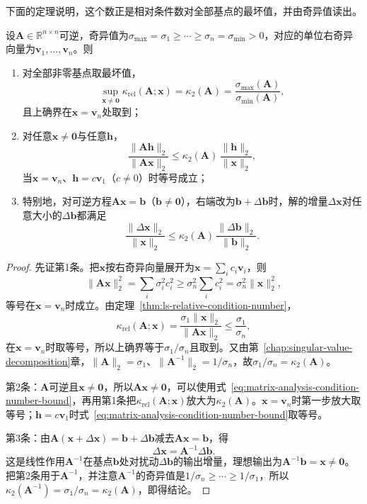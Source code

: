 下面的定理说明，这个数正是相对条件数对全部基点的最坏值，并由奇异值读出。
\begin{theorem}[条件数是相对条件数的最坏值]
\label{thm:matrix-analysis-condition-number-bound}
设$\bm A\in\mathbb R^{n\times n}$可逆，奇异值为$\sigma_{\max}=\sigma_1\geq\cdots\geq\sigma_n=\sigma_{\min}>0$，对应的单位右奇异向量为$\bm v_1,\ldots,\bm v_n$。则
\begin{enumerate}
 \item 对全部非零基点取最坏值，
 \begin{equation}
  \sup_{\bm x\neq\bm0}\kappa_{\mathrm{rel}}(\bm A;\bm x)
  =\kappa_2(\bm A)
  =\frac{\sigma_{\max}(\bm A)}{\sigma_{\min}(\bm A)},
  \label{eq:matrix-analysis-spectral-condition-number}
 \end{equation}
 且上确界在$\bm x=\bm v_n$处取到；
 \item 对任意$\bm x\neq\bm0$与任意$\bm h$，
 \[
  \frac{\lVert\bm A\bm h\rVert_2}{\lVert\bm A\bm x\rVert_2}
  \leq\kappa_2(\bm A)\,\frac{\lVert\bm h\rVert_2}{\lVert\bm x\rVert_2},
 \]
 当$\bm x=\bm v_n$、$\bm h=c\bm v_1$（$c\neq0$）时等号成立；
 \item 特别地，对可逆方程$\bm A\bm x=\bm b$（$\bm b\neq\bm0$），右端改为$\bm b+\Delta\bm b$时，解的增量$\Delta\bm x$对任意大小的$\Delta\bm b$都满足
 \begin{equation}
  \frac{\lVert\Delta\bm x\rVert_2}{\lVert\bm x\rVert_2}
  \leq\kappa_2(\bm A)\,\frac{\lVert\Delta\bm b\rVert_2}{\lVert\bm b\rVert_2}.
  \label{eq:matrix-analysis-condition-solution-bound}
 \end{equation}
\end{enumerate}
\end{theorem}
\begin{proof}
先证第1条。把$\bm x$按右奇异向量展开为$\bm x=\sum_ic_i\bm v_i$，则
\[
 \lVert\bm A\bm x\rVert_2^2=\sum_i\sigma_i^2c_i^2\geq\sigma_n^2\sum_ic_i^2=\sigma_n^2\lVert\bm x\rVert_2^2 ,
\]
等号在$\bm x=\bm v_n$时成立。由定理~\ref{thm:ls-relative-condition-number}，
\[
 \kappa_{\mathrm{rel}}(\bm A;\bm x)=\frac{\sigma_1\lVert\bm x\rVert_2}{\lVert\bm A\bm x\rVert_2}\leq\frac{\sigma_1}{\sigma_n},
\]
在$\bm x=\bm v_n$时取等号，所以上确界等于$\sigma_1/\sigma_n$且取到。又由第~\ref{chap:singular-value-decomposition}章，$\lVert\bm A\rVert_2=\sigma_1$、$\lVert\bm A^{-1}\rVert_2=1/\sigma_n$，故$\sigma_1/\sigma_n=\kappa_2(\bm A)$。

第2条：$\bm A$可逆且$\bm x\neq\bm0$，所以$\bm A\bm x\neq\bm0$，可以使用式~\eqref{eq:matrix-analysis-condition-number-bound}，再用第1条把$\kappa_{\mathrm{rel}}(\bm A;\bm x)$放大为$\kappa_2(\bm A)$。$\bm x=\bm v_n$时第一步放大取等号；$\bm h=c\bm v_1$时式~\eqref{eq:matrix-analysis-condition-number-bound}取等号。

第3条：由$\bm A(\bm x+\Delta\bm x)=\bm b+\Delta\bm b$减去$\bm A\bm x=\bm b$，得
\[
 \Delta\bm x=\bm A^{-1}\Delta\bm b .
\]
这是线性作用$\bm A^{-1}$在基点$\bm b$处对扰动$\Delta\bm b$的输出增量，理想输出为$\bm A^{-1}\bm b=\bm x\neq\bm0$。把第2条用于$\bm A^{-1}$，并注意$\bm A^{-1}$的奇异值是$1/\sigma_n\geq\cdots\geq1/\sigma_1$，所以$\kappa_2(\bm A^{-1})=\sigma_1/\sigma_n=\kappa_2(\bm A)$，即得结论。
\end{proof}
